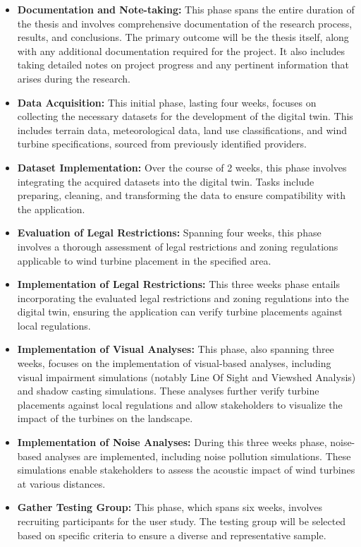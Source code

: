 \documentclass[11pt, titlepage, a4paper]{scrartcl}
\begin{document}
\begin{linenumbers}
    \begin{itemize}
        \item \textbf{Documentation and Note-taking:} This phase spans the entire duration of the thesis and involves comprehensive documentation of the research process, results, and conclusions. The primary outcome will be the thesis itself, along with any additional documentation required for the project. It also includes taking detailed notes on project progress and any pertinent information that arises during the research.
        \item \textbf{Data Acquisition:} This initial phase, lasting four weeks, focuses on collecting the necessary datasets for the development of the digital twin. This includes terrain data, meteorological data, land use classifications, and wind turbine specifications, sourced from previously identified providers.
        \item \textbf{Dataset Implementation:} Over the course of 2 weeks, this phase involves integrating the acquired datasets into the digital twin. Tasks include preparing, cleaning, and transforming the data to ensure compatibility with the application.
        \item \textbf{Evaluation of Legal Restrictions:} Spanning four weeks, this phase involves a thorough assessment of legal restrictions and zoning regulations applicable to wind turbine placement in the specified area.
        \item \textbf{Implementation of Legal Restrictions:} This three weeks phase entails incorporating the evaluated legal restrictions and zoning regulations into the digital twin, ensuring the application can verify turbine placements against local regulations.
        \item \textbf{Implementation of Visual Analyses:} This phase, also spanning three weeks, focuses on the implementation of visual-based analyses, including visual impairment simulations (notably Line Of Sight and Viewshed Analysis) and shadow casting simulations. These analyses further verify turbine placements against local regulations and allow stakeholders to visualize the impact of the turbines on the landscape.
        \item \textbf{Implementation of Noise Analyses:} During this three weeks phase, noise-based analyses are implemented, including noise pollution simulations. These simulations enable stakeholders to assess the acoustic impact of wind turbines at various distances.
        \item \textbf{Gather Testing Group:} This phase, which spans six weeks, involves recruiting participants for the user study. The testing group will be selected based on specific criteria to ensure a diverse and representative sample.

\end{itemize}
\end{linenumbers}
\end{document}
